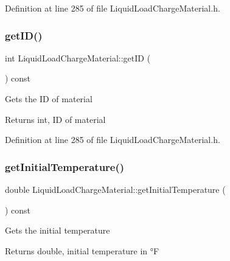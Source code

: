 Definition at line 285 of file Liquid\+Load\+Charge\+Material.\+h.

\mbox{\label{class_liquid_load_charge_material_a92591f91c6ed9fdda10733a439e86389}} 
\subsubsection{\texorpdfstring{get\+I\+D()}{getID()}\hspace{0.1cm}{\footnotesize\ttfamily [3/3]}}
{\footnotesize\ttfamily int Liquid\+Load\+Charge\+Material\+::get\+ID (\begin{DoxyParamCaption}{ }\end{DoxyParamCaption}) const\hspace{0.3cm}{\ttfamily [inline]}}

Gets the ID of material \begin{DoxyReturn}{Returns}
int, ID of material 
\end{DoxyReturn}


Definition at line 285 of file Liquid\+Load\+Charge\+Material.\+h.

\mbox{\label{class_liquid_load_charge_material_ab80229a78f884fb07e756665a616d401}} 
\subsubsection{\texorpdfstring{get\+Initial\+Temperature()}{getInitialTemperature()}\hspace{0.1cm}{\footnotesize\ttfamily [1/3]}}
{\footnotesize\ttfamily double Liquid\+Load\+Charge\+Material\+::get\+Initial\+Temperature (\begin{DoxyParamCaption}{ }\end{DoxyParamCaption}) const\hspace{0.3cm}{\ttfamily [inline]}}

Gets the initial temperature \begin{DoxyReturn}{Returns}
double, initial temperature in °F 
\end{DoxyReturn}


